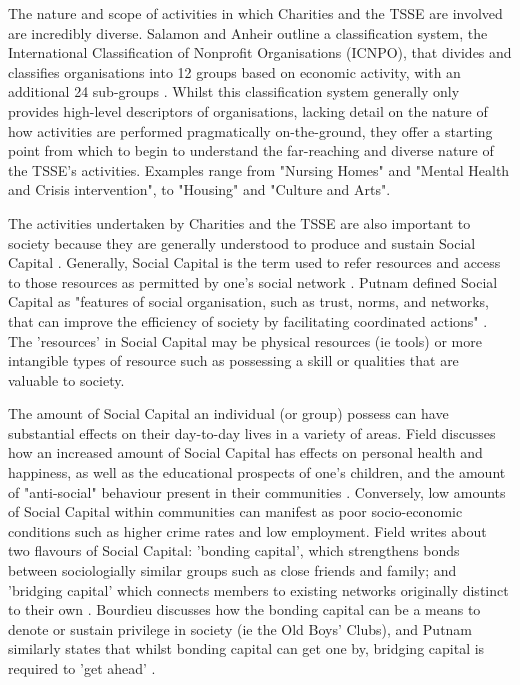 The nature and scope of activities in which Charities and the TSSE are involved are incredibly diverse. Salamon and Anheir outline a classification system, the International Classification of Nonprofit Organisations (ICNPO), that divides and classifies organisations into 12 groups based on economic activity, with an additional 24 sub-groups \cite{salamon_search_1992}. Whilst this classification system generally only provides high-level descriptors of organisations, lacking detail on the nature of how activities are performed pragmatically on-the-ground, they offer a starting point from which to begin to understand the far-reaching and diverse nature of the TSSE's activities. Examples range from "Nursing Homes" and "Mental Health and Crisis intervention", to "Housing" and "Culture and Arts".

The activities undertaken by Charities and the TSSE are also important to society because they are generally understood to produce and sustain Social Capital \cite{king_social_2004, wang_social_2008, swanson_strategic_2013}. Generally, Social Capital is the term used to refer resources and access to those resources as permitted by one's social network \cite{field_social_2003}. Putnam defined Social Capital as "features of social organisation, such as trust, norms, and networks, that can improve the efficiency of society by facilitating coordinated actions" . The 'resources' in Social Capital may be physical resources (ie tools) or more intangible types of resource such as possessing a skill or qualities that are valuable to society.

The amount of Social Capital an individual (or group) possess can have substantial effects on their day-to-day lives in a variety of areas. Field discusses how an increased amount of Social Capital has effects on personal health and happiness, as well as the educational prospects of one's children, and the amount of "anti-social" behaviour present in their communities \cite{field_social_2003}. Conversely, low amounts of Social Capital within communities can manifest as poor socio-economic conditions such as higher crime rates and low employment. Field writes about two flavours of Social Capital: 'bonding capital', which strengthens bonds between sociologially similar groups such as close friends and family; and 'bridging capital' which connects members to existing networks originally distinct to their own \cite{field_social_2003}. Bourdieu discusses how the bonding capital can be a means to denote or sustain privilege in society (ie the Old Boys' Clubs), and Putnam similarly states that whilst bonding capital can get one by, bridging capital is required to 'get ahead' .

